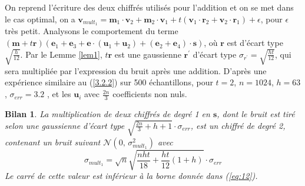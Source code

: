 \documentclass[11pt, headsepline, a4paper, fleqn, oneside]{article}
\newtheorem{Bilan}{Bilan}
\begin{document}
On reprend l'écriture des deux chiffrés utilisés pour l'addition et on se met dans le cas optimal, on a $\boldsymbol{v}_{mult_1} = \boldsymbol{m}_{1} \cdot \boldsymbol{v}_{2}+\boldsymbol{m}_{2}\cdot\boldsymbol{v}_{1}+t\left(\boldsymbol{v}_{1} \cdot \boldsymbol{r}_{2}+\boldsymbol{v}_{2} \cdot \boldsymbol{r}_{1}\right) + \epsilon$, pour $\epsilon$ très petit. Analysons le comportement du terme 
$(\boldsymbol{m} + t\boldsymbol{r})(\boldsymbol{e}_{1} + \boldsymbol{e}_{3} + \boldsymbol{e}\cdot(\boldsymbol{u}_{1} + \boldsymbol{u}_{2}) + (\boldsymbol{e}_{2} + \boldsymbol{e}_{4})\cdot\boldsymbol{s})$, où $\boldsymbol{r}$ est d'écart type $\sqrt{\frac{h}{12}}$. Par le Lemme \ref{lem1}, $t\boldsymbol{r}$ est une gaussienne $\boldsymbol{r}^\prime$ d'écart type $\sigma_{r^\prime} = \sqrt{\frac{ht}{12}}$, qui sera multipliée par l'expression du bruit après une addition. D'après une expérience similaire au (\ref{3.2.2}) sur 500 échantillons, pour $t=2$, $n=1024$, $h=63$, $\sigma_{err} = 3.2$ \cite{fan2012somewhat}, \cite{Cingulata} et les $\boldsymbol{u}_i$ avec $\frac{2n}{3}$ coefficients non nuls.

\begin{Bilan}
La multiplication de deux chiffrés de degré 1 en $\boldsymbol{s}$, dont le bruit est tiré selon une gaussienne d'écart type $\sqrt{\frac{2n}{3}+h+1} \cdot \sigma_{err}$, est un chiffré de degré 2, contenant un bruit suivant $\mathcal{N}(0,\,\sigma_{mult_1} ^2)$ avec
$$\sigma_{mult_1} = \sqrt{n}\sqrt{\frac{nht}{18} + \frac{ht}{12}(1+h)} \cdot \sigma_{err}$$
Le carré de cette valeur est inférieur à la borne donnée dans (\ref{eq:12}). 
\end{Bilan}
\end{document}
